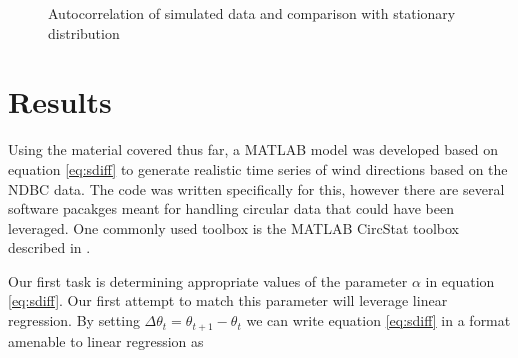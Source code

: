\documentclass[12pt]{article}
\numberwithin{equation}{section}
\numberwithin{figure}{section}
\begin{document}
\begin{figure}[h]
\centering
{}
\caption{Autocorrelation of simulated data and comparison with stationary distribution}\label{fig:sdfig}
\end{figure}

\section{Results}

Using the material covered thus far, a MATLAB model was developed based on equation \ref{eq:sdiff} to generate realistic time series of wind directions based on the NDBC data. The code was written specifically for this, however there are several software pacakges meant for handling circular data that could have been leveraged. One commonly used toolbox is the MATLAB CircStat toolbox described in \cite{circstat}. 

Our first task is determining appropriate values of the parameter $\alpha$ in equation \ref{eq:sdiff}. Our first attempt to match this parameter will leverage linear regression. By setting $\Delta \theta_t = \theta_{t+1} - \theta_t$ we can write equation \ref{eq:sdiff} in a format amenable to linear regression as 
\end{document}
